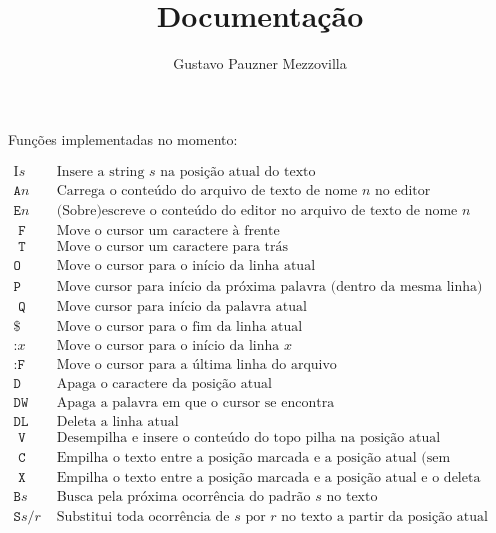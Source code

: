 \documentclass[a4paper]{article}
\title{Documentação}
\author{Gustavo Pauzner Mezzovilla}
\begin{document}
\maketitle

Funções implementadas no momento:

$$
\begin{array}{|c|l|}
\hline \text {I}s & \text { Insere a string } s \text { na posição atual do texto } \\
\texttt {A}n & \text { Carrega o conteúdo do arquivo de texto de nome } n \text { no editor } \\
\texttt{E}n & \text { (Sobre)escreve o conteúdo do editor no arquivo de texto de nome } n \\
\texttt{ F } & \text { Move o cursor um caractere à frente } \\
\texttt{ T } & \text { Move o cursor um caractere para trás } \\
\texttt{O} & \text { Move o cursor para o início da linha atual } \\
\texttt{P} & \text { Move cursor para início da próxima palavra (dentro da mesma linha) } \\
\texttt{ Q } & \text { Move cursor para início da palavra atual } \\
\$ & \text { Move o cursor para o fim da linha atual } \\
\texttt{:}x & \text { Move o cursor para o início da linha } x \\
\texttt{:F} & \text { Move o cursor para a última linha do arquivo } \\
\texttt{D} & \text { Apaga o caractere da posição atual } \\
\texttt{DW} & \text { Apaga a palavra em que o cursor se encontra } \\
\texttt{DL} & \text { Deleta a linha atual } \\
\texttt{ V } & \text { Desempilha e insere o conteúdo do topo pilha na posição atual } \\
\texttt{ C } & \text { Empilha o texto entre a posição marcada e a posição atual (sem modificá-lo) } \\
\texttt{ X } & \text { Empilha o texto entre a posição marcada e a posição atual e o deleta } \\
\texttt{B}s & \text { Busca pela próxima ocorrência do padrão } s \text { no texto } \\
\texttt{S}s/r & \text { Substitui toda ocorrência de } s \text { por } r \text { no texto a partir da posição atual } \\

\end{array}$$
\end{document}
